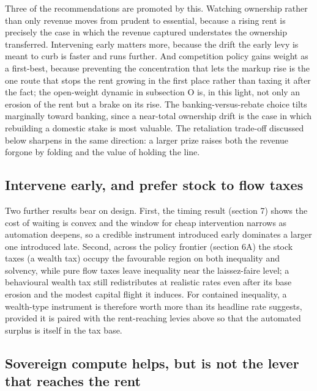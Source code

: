 \documentclass[12pt]{article}
\begin{document}
Three of the recommendations are promoted by this. Watching ownership
rather than only revenue moves from prudent to essential, because a
rising rent is precisely the case in which the revenue captured
understates the ownership transferred. Intervening early matters more,
because the drift the early levy is meant to curb is faster and runs
further. And competition policy gains weight as a first-best, because
preventing the concentration that lets the markup rise is the one route
that stops the rent growing in the first place rather than taxing it
after the fact; the open-weight dynamic in subsection O is, in this
light, not only an erosion of the rent but a brake on its rise. The
banking-versus-rebate choice tilts marginally toward banking, since a
near-total ownership drift is the case in which rebuilding a domestic
stake is most valuable. The retaliation trade-off discussed below
sharpens in the same direction: a larger prize raises both the revenue
forgone by folding and the value of holding the line.

\hypertarget{intervene-early-and-prefer-stock-to-flow-taxes}{%
\subsection{Intervene early, and prefer stock to flow
taxes}\label{intervene-early-and-prefer-stock-to-flow-taxes}}

Two further results bear on design. First, the timing result (section 7)
shows the cost of waiting is convex and the window for cheap
intervention narrows as automation deepens, so a credible instrument
introduced early dominates a larger one introduced late. Second, across
the policy frontier (section 6A) the stock taxes (a wealth tax) occupy
the favourable region on both inequality and solvency, while pure flow
taxes leave inequality near the laissez-faire level; a behavioural
wealth tax still redistributes at realistic rates even after its base
erosion and the modest capital flight it induces. For contained
inequality, a wealth-type instrument is therefore worth more than its
headline rate suggests, provided it is paired with the rent-reaching
levies above so that the automated surplus is itself in the tax base.

\hypertarget{sovereign-compute-helps-but-is-not-the-lever-that-reaches-the-rent}{%
\subsection{Sovereign compute helps, but is not the lever that reaches
the
rent}\label{sovereign-compute-helps-but-is-not-the-lever-that-reaches-the-rent}}
\end{document}

